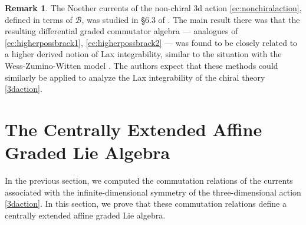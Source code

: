 \documentclass[11pt]{amsart}
\newcommand{\CB}{{\mathcal B}}
\numberwithin{equation}{section}
\numberwithin{figure}{section}
\numberwithin{table}{section}
\theoremstyle{thm}
\numberwithin{equation}{subsection}
\theoremstyle{definition}
\theoremstyle{rem}
\newtheorem{remark}{Remark}
\begin{document}
\begin{remark}\label{ncchargealg}
    The Noether currents of the non-chiral 3d action \eqref{ec:nonchiralaction}, defined in terms of $\CB$,
    was studied in \S 6.3 of \cite{Chen:2023integrable}. The main result there was that the resulting differential graded commutator algebra --- analogues of \eqref{ec:higherpossbrack1}, \eqref{ec:higherpossbrack2} --- was found to be closely related to a higher derived notion of Lax integrability, similar to the situation with the Wess-Zumino-Witten model \cite{Alekseev1990-hq}. The authors expect that these methods could similarly be applied to analyze the Lax integrability of the chiral theory  \eqref{3daction}. 
\end{remark}


\section{The Centrally Extended Affine Graded Lie Algebra}
\label{sec:ceagla}

In the previous section, we computed the commutation relations of the currents associated with the infinite-dimensional symmetry of the three-dimensional action \eqref{3daction}. In this section, we prove that these commutation relations define
a centrally extended affine graded Lie algebra.
\end{document}
